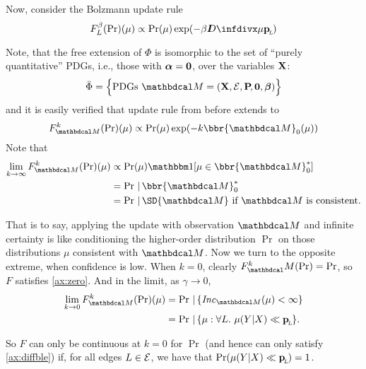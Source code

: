 \documentclass{article}
\begin{document}
Now, consider the Bolzmann update rule
\[
    F_L^{\beta}(\Pr) (\mu) \propto \Pr(\mu) \exp(-\beta \kldiv\mu \bp)
\]

Note, that the free extension of $\Phi$ is isomorphic to the set of ``purely quantitative'' PDGs, i.e., those with $\boldsymbol\alpha = \mathbf{0}$, over the variables $\mathbf{X}$:
$$
    \bar\Phi = \Big\{ \text{PDGs}~\dg M = (\mat X, \Ed, \bP[], \mat0, \bbeta) \Big\}
$$
and it is easily verified that update rule from before extends to
\[
    F_{\dg M}^k(\Pr)(\mu) \propto \Pr(\mu) \exp(- k \bbr{\dg M}_0(\mu))
\]
Note that
\begin{align*}
    \lim_{k \to \infty} F_{\dg M}^k(\Pr)(\mu) &\propto
        \Pr(\mu) \mathbbm1[\mu \in {\bbr{\dg M}^*_0}] \\
        &= \Pr \,|\, \bbr{\dg M}^*_0 \\
        &= \Pr \,|\, \SD{\dg M} \text{~if $\dg M$ is consistent.}
\end{align*}

That is to say, applying the update with observation $\dg M$ and infinite certainty is like conditioning the higher-order distribution $\Pr$ on those distributions $\mu$ consistent with $\dg M$.
Now we turn to the opposite extreme, when confidence is low. When $k=0$, clearly $F^k_\dg M(\Pr) = \Pr$, so $F$ satisfies \cref{ax:zero}. And in the limit, as $\gamma \to 0$,
\begin{align*}
    \lim_{k \to 0} F_{\dg M}^k(\Pr)(\mu) &= \Pr \,|\, \{ \Inc_{\dg M}(\mu) < \infty \} \\
        &= \Pr \,|\, \{\mu : \forall L.~\mu(Y|X) \ll \bp \}.
\end{align*}

So $F$ can only be continuous at $k=0$ for $\Pr$ (and hence can only satisfy \cref{ax:diffble}) if, for all edges $L \in \mathcal E$, we have that $\Pr(\mu(Y|X) \ll \mathbf{p}_{\!_{L}\!}) = 1$.



\subsubsection{}
\def\tauur{\mathtt{CPD\_UR}}
\end{document}
